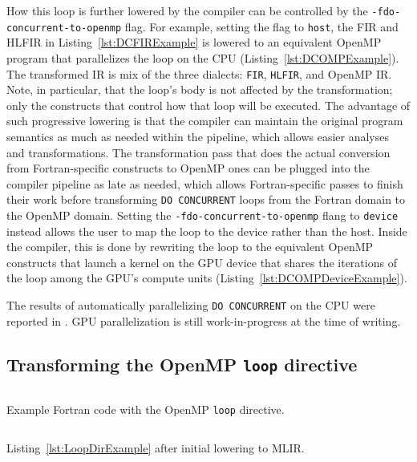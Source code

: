 \documentclass[acmtog,natbib=false]{acmart}
\newcommand{\code}[1]{\texttt{#1}\xspace}
\begin{document}
How this loop is further lowered by the compiler can be controlled by the \code{-fdo-concurrent-to-openmp} flag.
For example, setting the flag to \code{host}, the \ac{FIR} and \ac{HLFIR} in Listing~\ref{lst:DCFIRExample} is lowered to an equivalent OpenMP program that parallelizes the loop on the CPU (Listing~\ref{lst:DCOMPExample}).
The transformed IR is mix of the three dialects: \code{FIR}, \code{HLFIR}, and OpenMP \ac{IR}.
Note, in particular, that the loop's body is not affected by the transformation; only the constructs that control how that loop will be executed.
The advantage of such progressive lowering is that the compiler can maintain the original program semantics as much as needed within the pipeline, which allows easier analyses and transformations.
The transformation pass that does the actual conversion from Fortran-specific constructs to OpenMP ones can be plugged into the compiler pipeline as late as needed, which allows Fortran-specific passes to finish their work before transforming \code{DO CONCURRENT} loops from the Fortran domain to the OpenMP domain.
Setting the \code{-fdo-concurrent-to-openmp} flang to \code{device} instead allows the user to map the loop to the device rather than the host.
Inside the compiler, this is done by rewriting the loop to the equivalent OpenMP constructs that launch a kernel on the GPU device that shares the iterations of the loop among the GPU's compute units (Listing~\ref{lst:DCOMPDeviceExample}).

The results of automatically parallelizing \code{DO CONCURRENT} on the CPU were reported in \cite{rouson2025automatically}.
GPU parallelization is still work-in-progress at the time of writing.

\subsection{Transforming the OpenMP \code{loop} directive}

\begin{listing}[t]
\inputminted{Fortran}{code/loop_dir_reduction.f90}
\caption{Example Fortran code with the OpenMP \code{loop} directive.}
\label{lst:LoopDirExample}
\end{listing}

\begin{listing}[t]
\inputminted{MLIR-lexer.py:MlirLexer -x}{code/loop_dir_reduction.mlir}
\caption{Listing~\ref{lst:LoopDirExample} after initial lowering to MLIR.}
\label{lst:LoopDirMLIRExample}
\end{listing}
\end{document}
